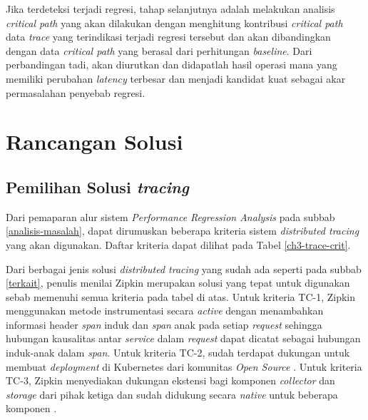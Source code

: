 Jika terdeteksi terjadi regresi, tahap selanjutnya adalah melakukan analisis \textit{critical path} yang akan dilakukan dengan menghitung kontribusi \textit{critical path} data \textit{trace} yang terindikasi terjadi regresi tersebut dan akan dibandingkan dengan data \textit{critical path} yang berasal dari perhitungan \textit{baseline}. Dari perbandingan tadi, akan diurutkan dan didapatlah hasil operasi mana yang memiliki perubahan \textit{latency} terbesar dan menjadi kandidat kuat sebagai akar permasalahan penyebab regresi.



\section{Rancangan Solusi}

\subsection{Pemilihan Solusi \textit{tracing}}

Dari pemaparan alur sistem \textit{Performance Regression Analysis} pada subbab \ref{analisis-masalah}, dapat dirumuskan beberapa kriteria sistem \textit{distributed tracing} yang akan digunakan. Daftar kriteria dapat dilihat pada Tabel \ref{ch3-trace-crit}.

Dari berbagai jenis solusi \textit{distributed tracing} yang sudah ada seperti pada subbab \ref{terkait}, penulis menilai Zipkin merupakan solusi yang tepat untuk digunakan sebab memenuhi semua kriteria pada tabel di atas. Untuk kriteria TC-1, Zipkin menggunakan metode instrumentasi secara \textit{active} dengan menambahkan informasi header \textit{span} induk dan \textit{span} anak pada setiap \textit{request} sehingga hubungan kausalitas antar \textit{service} dalam \textit{request} dapat dicatat sebagai hubungan induk-anak dalam \textit{span}. Untuk kriteria TC-2, sudah terdapat dukungan untuk membuat \textit{deployment} di Kubernetes dari komunitas \textit{Open Source} \citep{zipkin-ambassador}. Untuk kriteria TC-3, Zipkin menyediakan dukungan ekstensi bagi komponen \textit{collector} dan \textit{storage} dari pihak ketiga dan sudah didukung secara \textit{native} untuk beberapa komponen \citep{zipkin-storage}.

